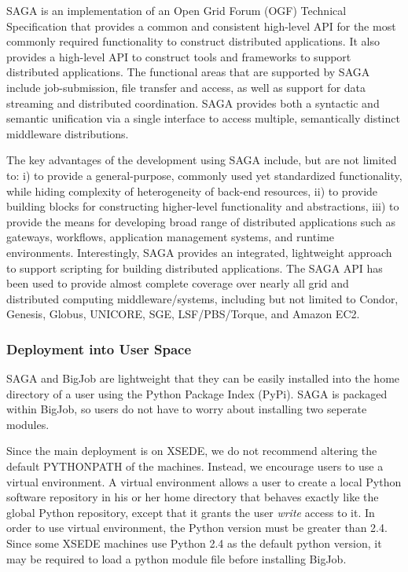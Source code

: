 \documentclass{sig-alternate}
\begin{document}
SAGA is an implementation of an Open Grid Forum (OGF) Technical 
Specification that provides a common and consistent high-level 
API for the most commonly required functionality to construct 
distributed applications. It also provides a high-level API to 
construct tools and frameworks to support distributed applications. 
The functional areas that are supported by SAGA include job-submission,
file transfer and access, as well as support for data streaming and distributed 
coordination. SAGA provides both a syntactic and semantic unification via a 
single interface to access multiple, semantically distinct middleware distributions.

The key advantages of the development using SAGA include, but 
are not limited to: i) to provide a general-purpose, commonly used yet standardized functionality, while hiding complexity of heterogeneity of back-end resources, 
ii) to provide building blocks for constructing higher-level functionality
and abstractions, iii) to provide the means for developing
broad range of distributed applications such as gateways,
workflows, application management systems, and runtime
environments. Interestingly, SAGA provides an integrated,
lightweight approach to support scripting for building distributed applications. The SAGA
API has been used to provide almost complete coverage over nearly all grid
and distributed computing middleware/systems, including
but not limited to Condor, Genesis, Globus, UNICORE, SGE,
LSF/PBS/Torque, and Amazon EC2.


\subsubsection{Deployment into User Space}

SAGA and BigJob are lightweight that they can be easily installed into 
the home directory of a user using the Python Package Index (PyPi). SAGA is 
packaged within BigJob, so users do not have to worry about installing two
seperate modules. 

Since the main deployment is on XSEDE, we do not recommend
altering the default PYTHONPATH of the machines. Instead, we encourage users to
use a virtual environment. A virtual environment allows a user to create a local
Python software repository in his or her home directory that behaves exactly like the 
global Python repository, except that it grants the user \textit{write} access to it. In 
order to use virtual environment, the Python version must be greater than 2.4. Since 
some XSEDE machines use Python 2.4 as the default python version, it may be required
to load a python module file before installing BigJob.
\end{document}
